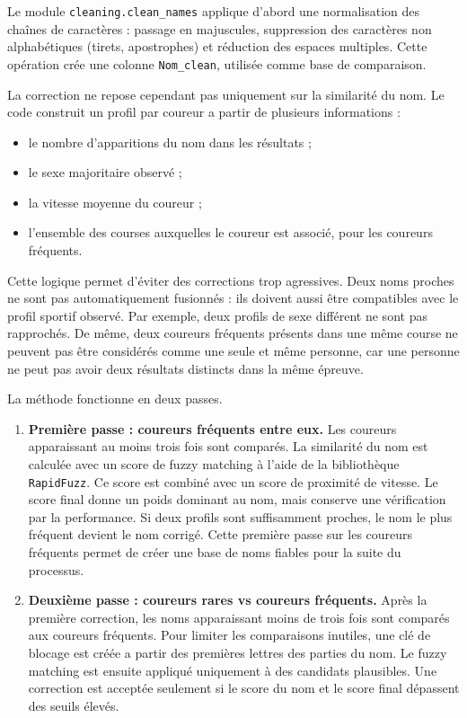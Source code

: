 \documentclass[12pt,a4paper]{article}
\begin{document}
Le module \texttt{cleaning.clean\_names} applique d'abord une normalisation des chaînes de caractères : passage en majuscules, suppression des caractères non alphabétiques (tirets, apostrophes) et réduction des espaces multiples. Cette opération crée une colonne \texttt{Nom\_clean}, utilisée comme base de comparaison.

La correction ne repose cependant pas uniquement sur la similarité du nom. Le code construit un profil par coureur a partir de plusieurs informations :

\begin{itemize}
    \item le nombre d'apparitions du nom dans les résultats ;
    \item le sexe majoritaire observé ;
    \item la vitesse moyenne du coureur ;
    \item l'ensemble des courses auxquelles le coureur est associé, pour les coureurs fréquents.
\end{itemize}

Cette logique permet d'éviter des corrections trop agressives. Deux noms proches ne sont pas automatiquement fusionnés : ils doivent aussi être compatibles avec le profil sportif observé. Par exemple, deux profils de sexe différent ne sont pas rapprochés. De même, deux coureurs fréquents présents dans une même course ne peuvent pas être considérés comme une seule et même personne, car une personne ne peut pas avoir deux résultats distincts dans la même épreuve.

La méthode fonctionne en deux passes.

\begin{enumerate}[label=\arabic*.]
    \item \textbf{Première passe : coureurs fréquents entre eux.} Les coureurs apparaissant au moins trois fois sont comparés. La similarité du nom est calculée avec un score de fuzzy matching à l'aide de la bibliothèque \texttt{RapidFuzz}. Ce score est combiné avec un score de proximité de vitesse. Le score final donne un poids dominant au nom, mais conserve une vérification par la performance. Si deux profils sont suffisamment proches, le nom le plus fréquent devient le nom corrigé. Cette première passe sur les coureurs fréquents permet de créer une base de noms fiables pour la suite du processus.
    \item \textbf{Deuxième passe : coureurs rares vs coureurs fréquents.} Après la première correction, les noms apparaissant moins de trois fois sont comparés aux coureurs fréquents. Pour limiter les comparaisons inutiles, une clé de blocage est créée a partir des premières lettres des parties du nom. Le fuzzy matching est ensuite appliqué uniquement à des candidats plausibles. Une correction est acceptée seulement si le score du nom et le score final dépassent des seuils élevés.
\end{enumerate}
\end{document}

